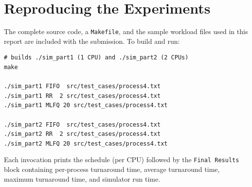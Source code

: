 \documentclass[11pt]{article}
\begin{document}
\section{Reproducing the Experiments}
The complete source code, a \texttt{Makefile}, and the sample workload
files used in this report are included with the submission. To build and
run:
\begin{lstlisting}
# builds ./sim_part1 (1 CPU) and ./sim_part2 (2 CPUs)
make

./sim_part1 FIFO  src/test_cases/process4.txt
./sim_part1 RR  2 src/test_cases/process4.txt
./sim_part1 MLFQ 20 src/test_cases/process4.txt

./sim_part2 FIFO  src/test_cases/process4.txt
./sim_part2 RR  2 src/test_cases/process4.txt
./sim_part2 MLFQ 20 src/test_cases/process4.txt
\end{lstlisting}
Each invocation prints the schedule (per CPU) followed by the
\texttt{Final Results} block containing per-process turnaround time,
average turnaround time, maximum turnaround time, and simulator run time.
\end{document}
